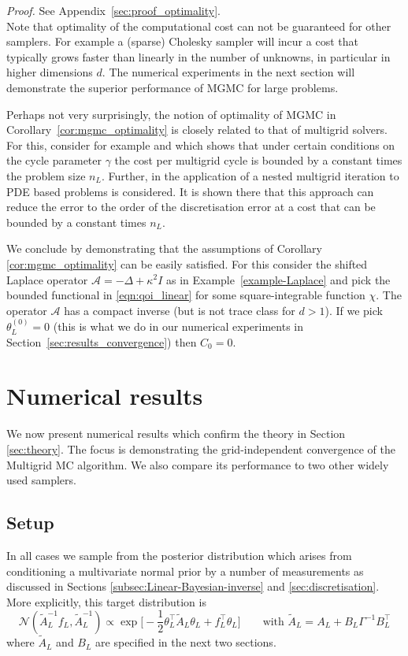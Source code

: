 \documentclass[11pt,english]{article}
\theoremstyle{plain}
\theoremstyle{plain}
\theoremstyle{plain}
\theoremstyle{plain}
\numberwithin{equation}{section}
\newcommand*{\id}{I}
\begin{document}
\noindent\textit{Proof.} See Appendix~\ref{sec:proof_optimality}.\\[1ex]
Note that optimality of the computational cost can not be guaranteed for other samplers. For example a (sparse) Cholesky sampler will incur a cost that typically grows faster than linearly in the number of unknowns, in particular in higher dimensions $d$. The numerical experiments in the next section will demonstrate the superior performance of MGMC for large problems. 

Perhaps not very surprisingly, the notion of optimality of MGMC in Corollary~\ref{cor:mgmc_optimality} is closely related to that of multigrid solvers. For this, consider for example \cite[Theorem 11.16]{Hackbusch.W_2016_IterativeSolutionLarge} and \cite[Remark 11.17]{Hackbusch.W_2016_IterativeSolutionLarge} which shows that under certain conditions on the cycle parameter $\gamma$ the cost per multigrid cycle is bounded by a constant times the problem size $n_L$. Further, in \cite[Section 11.5.5]{Hackbusch.W_2016_IterativeSolutionLarge} the application of a nested multigrid iteration to PDE based problems is considered. It is shown there that this approach can reduce the error to the order of the discretisation error at a cost that can be bounded by a constant times $n_L$.

We conclude by demonstrating that the assumptions of Corollary \ref{cor:mgmc_optimality} can be easily satisfied. For this consider the shifted Laplace operator $\mathcal{A}=-\Delta+\kappa^2\id$ as in Example~\ref{example-Laplace} and pick the bounded functional in \eqref{eqn:qoi_linear} for some square-integrable function $\chi$. The operator $\mathcal{A}$ has a compact inverse (but is not trace class for $d>1$). If we pick $\theta_L^{(0)}=0$ (this is what we do in our numerical experiments in Section~\ref{sec:results_convergence}) then $C_0=0$.

\section{Numerical results}\label{sec:results}
We now present numerical results which confirm the theory in Section \ref{sec:theory}. The focus is demonstrating the grid-independent convergence of the Multigrid MC algorithm. We also compare its performance to two other widely used samplers.
\subsection{Setup}\label{sec:setup}
In all cases we sample from the posterior distribution which arises from conditioning a multivariate normal prior by a number of measurements as discussed in Sections \ref{subsec:Linear-Bayesian-inverse} and \ref{sec:discretisation}. More explicitly, this target distribution is
\begin{equation}
    \mathcal{N}(\widetilde{A}_L^{-1}f_L,\widetilde{A}_L^{-1}) \propto \exp\big[-\frac{1}{2}\theta_L^\top \widetilde{A}_L\theta_L + f_L^\top \theta_L \big]
    \qquad\text{with $\widetilde{A}_L = A_L + B_L\Gamma^{-1} B_L^\top$}\label{eqn:target_distribution}
\end{equation}
where $\widetilde{A}_L$ and $B_L$ are specified in the next two sections.
\end{document}
